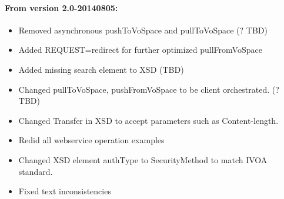 \documentclass[11pt,a4paper]{ivoa}
\begin{document}
\paragraph{From version 2.0-20140805:}
\begin{itemize}
    \item Removed asynchronous pushToVoSpace and pullToVoSpace (? TBD)
    \item Added REQUEST=redirect for further optimized pullFromVoSpace
    \item Added missing search element to XSD (TBD)
    \item Changed pullToVoSpace, pushFromVoSpace to be client orchestrated. (? TBD)
    \item Changed Transfer in XSD to accept parameters such as Content-length.
    \item Redid all webservice operation examples
    \item Changed XSD element authType to SecurityMethod to match IVOA standard.
    \item Fixed text inconsistencies
\end{itemize}
\end{document}
